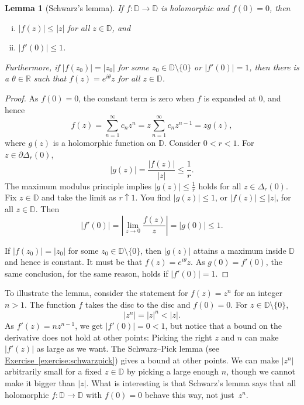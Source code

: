 \documentclass[12pt,openany]{book}
\newcommand{\sabs}[1]{\lvert {#1} \rvert}
\newcommand{\abs}[1]{\left\lvert {#1} \right\rvert}
\newcommand{\R}{{\mathbb{R}}}
\newcommand{\D}{{\mathbb{D}}}
\theoremstyle{plain}
\newtheorem{lemma}[thm]{Lemma}
\theoremstyle{remark}
\theoremstyle{definition}
\theoremstyle{exercise}
\theoremstyle{example}
\newcommand{\exerciseref}[1]{\hyperref[#1]{Exercise~\ref*{#1}}}
\begin{document}
\begin{lemma}[Schwarz's lemma]\label{lemma:schwarz}
If $f \colon \D \to \D$ is holomorphic and $f(0) = 0$,
then 
\begin{enumerate}[(i)]
\item $\sabs{f(z)} \leq \sabs{z}$ for all $z \in \D$, and
\item $\sabs{f'(0)} \leq 1$.
\end{enumerate}
Furthermore, if $\sabs{f(z_0)} = \sabs{z_0}$ for some $z_0 \in \D \setminus
\{ 0 \}$
or $\sabs{f'(0)} = 1$, then
there is a $\theta \in \R$ such that $f(z) =
e^{i\theta} z$ for all $z \in \D$.
\end{lemma}

\begin{proof}
As $f(0) = 0$, the constant term is zero when $f$ is expanded at $0$, and hence
\begin{equation*}
f(z) = \sum_{n=1}^\infty c_n z^n = z \sum_{n=1}^\infty c_n z^{n-1} = z g(z) ,
\end{equation*}
where $g(z)$ is a holomorphic function on $\D$.
Consider $0 < r < 1$.
For $z \in \partial \Delta_r(0)$,
\begin{equation*}
\sabs{g(z)} = \frac{\sabs{f(z)}}{\sabs{z}} \leq \frac{1}{r}  .
\end{equation*}
The maximum modulus principle implies $\sabs{g(z)} \leq \frac{1}{r}$
holds for all $z \in \Delta_r(0)$.
Fix $z \in \D$ and take the limit as $r \uparrow 1$. 
You find
$\sabs{g(z)} \leq 1$,
or
$\sabs{f(z)} \leq \sabs{z}$,
for all $z \in \D$.  Then
\begin{equation*}
\abs{f'(0)}
=
\abs{\lim_{z \to 0} \frac{f(z)}{z}} = \sabs{g(0)} \leq 1 .
\end{equation*}

If $\sabs{f(z_0)} = \sabs{z_0}$ for some $z_0 \in \D \setminus \{ 0 \}$,
then $\sabs{g(z)}$ attains a maximum inside $\D$ and hence is constant.
It must be that $f(z) = e^{i \theta} z$.
As $g(0) = f'(0)$, the same conclusion, for the same reason,
holds if $\sabs{f'(0)} = 1$.
\end{proof}

To illustrate the lemma, consider the statement for $f(z) = z^n$
for an integer $n > 1$.  The function $f$ takes the disc to the disc
and $f(0) = 0$.  For $z \in \D \setminus \{ 0 \}$,
\begin{equation*}
\sabs{z^n} =
\sabs{z}^n < \sabs{z} .
\end{equation*}
As $f'(z) = n z^{n-1}$, we get
$\sabs{f'(0)} = 0 < 1$, but notice that a bound on the derivative
does not hold at other points:
Picking the right $z$ and $n$
can make $\sabs{f'(z)}$ as large as we want.
The Schwarz--Pick lemma
(see \exerciseref{exercise:schwarzpick}) gives
a bound at other points.
We can make $\sabs{z^n}$ arbitrarily small for a fixed $z \in \D$ by picking
a large enough $n$, though we cannot make it bigger than $\sabs{z}$.  What is
interesting is that Schwarz's lemma says that all holomorphic $f \colon \D
\to \D$ with $f(0)=0$
behave this way, not just~$z^n$.
\end{document}
